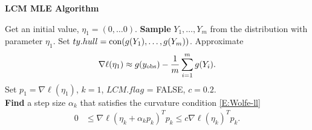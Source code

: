 {\small
\noindent \textbf{LCM MLE Algorithm}

\noindent \begin{algorithmic}[1]
\State Get an initial value, $\eta_1 = (0, \ldots 0)$.
\State \textbf{Sample} $Y_1, \ldots, Y_m$ from the distribution with parameter $\eta_{1}$.  
\State Set $ty.hull = \operatorname{con}(g(Y_1), \ldots, g(Y_m) )$.
\State Approximate 
\begin{align*}
\nabla \ell( \eta_1) \approx g(y_{\text{obs}}) - \frac{1}{m}\sum_{i=1}^m g(Y_i).
\end{align*}
\State Set $p_1 = \nabla \ell( \eta_1)$, $k=1$, $LCM.flag$ = FALSE, $c=0.2$.\\

\State \textbf{Find} a step size $\alpha_k$ that satisfies the curvature condition \eqref{E:Wolfe-ll}
\begin{align*}%
	 0 & \leq \nabla \ell( \eta_k + \alpha_k p_k)^T p_k \leq c \nabla \ell(\eta_k)^T p_k.
\end{align*}


\end{algorithmic}}
